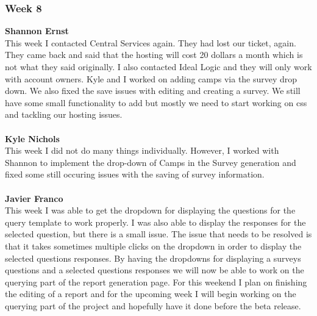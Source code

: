 \documentclass[../final.tex]{subfiles}
\begin{document}
\subsubsection{Week 8}
\textbf{Shannon Ernst}\\
This week I contacted Central Services again. They had lost our ticket, again. They came back and said that the hosting will cost 20 dollars a month which is not what they said originally. I also contacted Ideal Logic and they will only work with account owners. Kyle and I worked on adding camps via the survey drop down. We also fixed the save issues with editing and creating a survey. We still have some small functionality to add but mostly we need to start working on css and tackling our hosting issues. \\ \\
\textbf{Kyle Nichols}\\
This week I did not do many things individually. However, I worked with Shannon to implement the drop-down of Camps in the Survey generation and fixed some still occuring issues with the saving of survey information. \\ \\
\textbf{Javier Franco}\\
This week I was able to get the dropdown for displaying the questions for the query template to work properly. I was also able to display the responses for the selected question, but there is a small issue. The issue that needs to be resolved is that it takes sometimes multiple clicks on the dropdown in order to display the selected questions responses. By having the dropdowns for displaying a surveys questions and a selected questions responses we will now be able to work on the querying part of the report generation page. For this weekend I plan on finishing the editing of a report and for the upcoming week I will begin working on the querying part of the project and hopefully have it done before the beta release. \\
\end{document}
